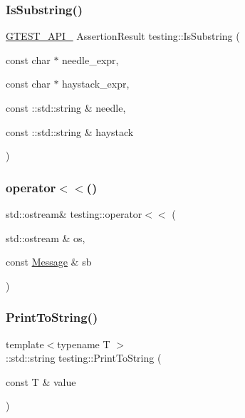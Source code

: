 \subsubsection{\texorpdfstring{Is\+Substring()}{IsSubstring()}\hspace{0.1cm}{\footnotesize\ttfamily [3/3]}}
{\footnotesize\ttfamily \hyperlink{gtest-port_8h_aa73be6f0ba4a7456180a94904ce17790}{G\+T\+E\+S\+T\+\_\+\+A\+P\+I\+\_\+} Assertion\+Result testing\+::\+Is\+Substring (\begin{DoxyParamCaption}\item[{const char $\ast$}]{needle\+\_\+expr,  }\item[{const char $\ast$}]{haystack\+\_\+expr,  }\item[{const \+::std\+::string \&}]{needle,  }\item[{const \+::std\+::string \&}]{haystack }\end{DoxyParamCaption})}

\mbox{\label{namespacetesting_a7b802e532fd68749765cb7dc156130db}} 
\subsubsection{\texorpdfstring{operator$<$$<$()}{operator<<()}}
{\footnotesize\ttfamily std\+::ostream\& testing\+::operator$<$$<$ (\begin{DoxyParamCaption}\item[{std\+::ostream \&}]{os,  }\item[{const \hyperlink{classtesting_1_1Message}{Message} \&}]{sb }\end{DoxyParamCaption})\hspace{0.3cm}{\ttfamily [inline]}}

\mbox{\label{namespacetesting_aa5717bb1144edd1d262d310ba70c82ed}} 
\subsubsection{\texorpdfstring{Print\+To\+String()}{PrintToString()}}
{\footnotesize\ttfamily template$<$typename T $>$ \\
\+::std\+::string testing\+::\+Print\+To\+String (\begin{DoxyParamCaption}\item[{const T \&}]{value }\end{DoxyParamCaption})}

